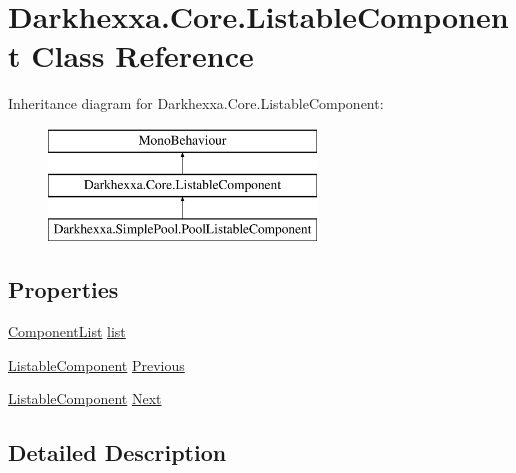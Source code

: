\hypertarget{class_darkhexxa_1_1_core_1_1_listable_component}{\section{Darkhexxa.\-Core.\-Listable\-Component Class Reference}
\label{class_darkhexxa_1_1_core_1_1_listable_component}
}
Inheritance diagram for Darkhexxa.\-Core.\-Listable\-Component\-:\begin{figure}[H]
\begin{center}
\leavevmode
\includegraphics[height=3.000000cm]{class_darkhexxa_1_1_core_1_1_listable_component}
\end{center}
\end{figure}
\subsection*{Properties}
\begin{DoxyCompactItemize}
\item 
\hyperlink{class_darkhexxa_1_1_core_1_1_component_list}{Component\-List} \hyperlink{class_darkhexxa_1_1_core_1_1_listable_component_a04c51fde5d01ceae927e191e1420c27e}{list}
\item 
\hyperlink{class_darkhexxa_1_1_core_1_1_listable_component}{Listable\-Component} \hyperlink{class_darkhexxa_1_1_core_1_1_listable_component_afe73beef049d8199b6c205e27653ae29}{Previous}
\item 
\hyperlink{class_darkhexxa_1_1_core_1_1_listable_component}{Listable\-Component} \hyperlink{class_darkhexxa_1_1_core_1_1_listable_component_acd3a93b2ac0c5536bad8a3fd74cc1e5a}{Next}
\end{DoxyCompactItemize}


\subsection{Detailed Description}


